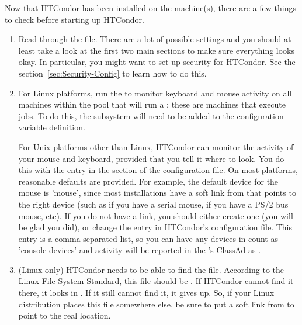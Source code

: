 
Now that HTCondor has been installed on the machine(s), there are a few
things to check before starting up HTCondor.

\begin{enumerate}
\item Read through the  file.  There are a
    lot of possible settings and you should at least take a look at
    the first two main sections to make sure everything looks okay.
    In particular, you might want to set up security for
    HTCondor.  See the section~\ref{sec:Security-Config}
    to learn how to do this.

\item For Linux platforms, run the  to monitor keyboard
    and mouse activity on all machines within the pool that will
    run a ; these are machines that execute jobs.
    To do this, the subsystem  will need to be added to
    the  configuration variable definition.

    For Unix platforms other than Linux,
    HTCondor can monitor the activity of your mouse and keyboard,
    provided that you tell it where to look.  You do this with the
     entry in the  section of
    the configuration file.  On most platforms, reasonable
    defaults are provided.
    For example, the default device for the mouse
    is 'mouse', since most installations have a soft link from
     that points to the right device (such as
     if you have a serial mouse,  if you have
    a PS/2 bus mouse, etc).  If you do not have a 
    link, you should either create one (you will be glad you did), or
    change the  entry in HTCondor's
    configuration file.
    This entry is a comma separated list, so you can have any
    devices in  count as 'console devices' and activity
    will be reported in the 's ClassAd as
    .

\item  (Linux only) HTCondor needs to be able to find the  file.
    According to the Linux File System Standard, this file should be
    .  If HTCondor cannot find it there, it looks in
    .  If it still cannot find it, it gives up.  So, if
    your Linux distribution places this file somewhere else, be sure to
    put a soft link from  to point to the real location.

\end{enumerate}

